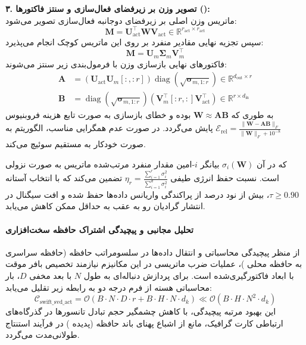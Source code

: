 \textbf{۳. تصویر وزن بر زیرفضای فعال‌سازی و سنتز فاکتورها ():} \\
ماتریس وزن اصلی بر زیرفضای دوجانبه فعال‌سازی تصویر می‌شود:
\begin{equation}
\mathbf{M} = \mathbf{U}_{\text{act}}^\top \mathbf{W} \mathbf{V}_{\text{act}} \in \mathbb{R}^{r_{\text{act}} \times r_{\text{act}}}
\end{equation}
سپس تجزیه نهایی مقادیر منفرد بر روی این ماتریس کوچک انجام می‌پذیرد:
\begin{equation}
\mathbf{M} = \mathbf{U}_m \mathbf{\Sigma}_m \mathbf{V}_m^\top
\end{equation}
فاکتورهای نهایی بازسازی وزن با فرمول‌بندی زیر سنتز می‌شوند:
\begin{align}
\mathbf{A} &= (\mathbf{U}_{\text{act}} \mathbf{U}_m[:, :r]) \operatorname{diag}(\sqrt{\mathbf{\sigma}_{m, 1:r}}) \in \mathbb{R}^{d_{\text{out}} \times r} \\
\mathbf{B} &= \operatorname{diag}(\sqrt{\mathbf{\sigma}_{m, 1:r}}) (\mathbf{V}_m^\top[:r, :] \mathbf{V}_{\text{act}}^\top) \in \mathbb{R}^{r \times d_{\text{in}}}
\end{align}
به طوری که $\mathbf{W} \approx \mathbf{A} \mathbf{B}$ بوده و خطای بازسازی به صورت تابع هزینه فروبنیوس $\mathcal{E}_{\text{rel}} = \frac{\|\mathbf{W} - \mathbf{A}\mathbf{B}\|_F}{\|\mathbf{W}\|_F + 10^{-8}}$ پایش می‌گردد. در صورت عدم همگرایی مناسب، الگوریتم به صورت خودکار به  مستقیم سوئیچ می‌کند.

که در آن $\sigma_i(\mathbf{W})$ بیانگر $i$-امین مقدار منفرد مرتب‌شده ماتریس به صورت نزولی است. نسبت حفظ انرژی طیفی $\eta_r = \frac{\sum_{i=1}^r \sigma_i^2}{\sum_{i=1}^{d} \sigma_i^2}$ تضمین می‌کند که با انتخاب آستانه $\tau \ge 0.90$، بیش از نود درصد از پراکندگی واریانس داده‌ها حفظ شده و افت سیگنال در انتشار گرادیان رو به عقب به حداقل ممکن کاهش می‌یابد.

\paragraph{تحلیل مجانبی و پیچیدگی اشتراک حافظه سخت‌افزاری}
از منظر پیچیدگی محاسباتی و انتقال داده‌ها در سلسومراتب حافظه (حافظه سراسری  به حافظه محلی )، عملیات ضرب ماتریسی در این مکانیزم نیازمند تخصیص بافر موقت با ابعاد فاکتورگیری‌شده است. برای پردازش دنباله‌ای به طول $N$ با بعد مخفی $D$، بار محاسباتی هسته از فرم درجه دو به رابطه زیر تقلیل می‌یابد:
\begin{equation}
\label{eq:complexity_swift_svd_act}
\mathcal{C}_{\text{swift\_svd\_act}} = \mathcal{O}\left( B \cdot N \cdot D \cdot r + B \cdot H \cdot N \cdot d_k \right) \ll \mathcal{O}\left( B \cdot H \cdot N^2 \cdot d_k \right)
\end{equation}
این بهبود مرتبه پیچیدگی، با کاهش چشمگیر حجم تبادل تانسورها در گذرگاه‌های ارتباطی کارت گرافیک، مانع از اشباع پهنای باند حافظه (پدیده ) در فرآیند استنتاج طولانی‌مدت می‌گردد.
